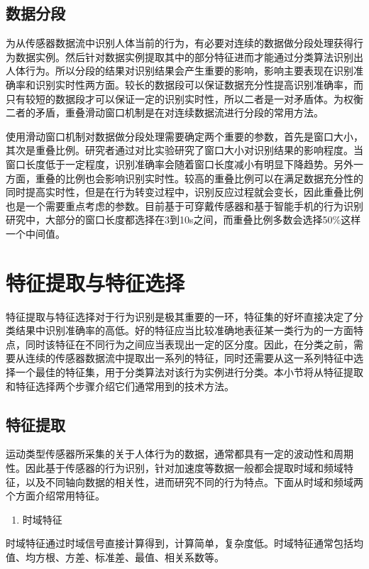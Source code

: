 \subsection{数据分段}
\par 为从传感器数据流中识别人体当前的行为，有必要对连续的数据做分段处理获得行为数据实例。然后针对数据实例提取其中的部分特征进而才能通过分类算法识别出人体行为。所以分段的结果对识别结果会产生重要的影响，影响主要表现在识别准确率和识别实时性两方面。较长的数据段可以保证数据充分性提高识别准确率，而只有较短的数据段才可以保证一定的识别实时性，所以二者是一对矛盾体。为权衡二者的矛盾，重叠滑动窗口机制是在对连续数据流进行分段的常用方法。
\par 使用滑动窗口机制对数据做分段处理需要确定两个重要的参数，首先是窗口大小，其次是重叠比例。研究者通过对比实验研究了窗口大小对识别结果的影响程度。当窗口长度低于一定程度，识别准确率会随着窗口长度减小有明显下降趋势。另外一方面，重叠的比例也会影响识别实时性。较高的重叠比例可以在满足数据充分性的同时提高实时性，但是在行为转变过程中，识别反应过程就会变长，因此重叠比例也是一个需要重点考虑的参数。目前基于可穿戴传感器和基于智能手机的行为识别研究中，大部分的窗口长度都选择在3到10s之间，而重叠比例多数会选择50\%这样一个中间值。

\section{特征提取与特征选择}
\par 特征提取与特征选择对于行为识别是极其重要的一环，特征集的好坏直接决定了分类结果中识别准确率的高低。好的特征应当比较准确地表征某一类行为的一方面特点，同时该特征在不同行为之间应当表现出一定的区分度。因此，在分类之前，需要从连续的传感器数据流中提取出一系列的特征，同时还需要从这一系列特征中选择一个最佳的特征集，用于分类算法对该行为实例进行分类。本小节将从特征提取和特征选择两个步骤介绍它们通常用到的技术方法。

\subsection{特征提取}
\par 运动类型传感器所采集的关于人体行为的数据，通常都具有一定的波动性和周期性。因此基于传感器的行为识别，针对加速度等数据一般都会提取时域和频域特征，以及不同轴向数据的相关性，进而研究不同的行为特点。下面从时域和频域两个方面介绍常用特征。

\begin{enumerate}[(1)]
	\item 时域特征
\end{enumerate}
\par 时域特征通过时域信号直接计算得到，计算简单，复杂度低。时域特征通常包括均值、均方根、方差、标准差、最值、相关系数等。


